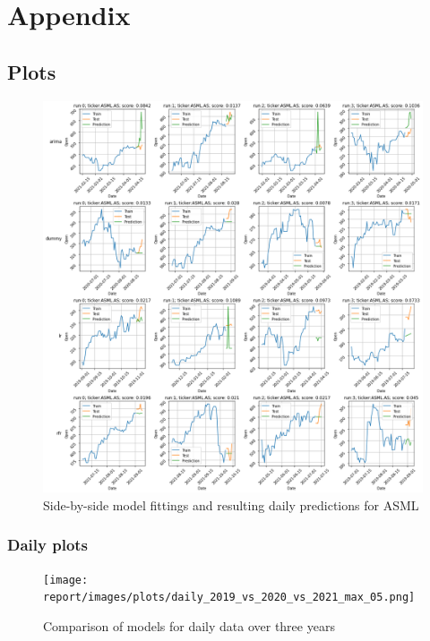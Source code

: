 \clearpage

\onecolumn

\appendix

\section{Appendix}

\subsection{Plots}

\begin{figure}[H]
  \includegraphics[width=\textwidth]{images/plots/sample_fits_asml.png}
  \caption{Side-by-side model fittings and resulting daily predictions for ASML}
  \label{fig:samplefits}
\end{figure}

\pagebreak

\subsubsection{Daily plots}

\twocolumn

\begin{figure}[H]
    \texttt{[image: report/images/plots/daily\_2019\_vs\_2020\_vs\_2021\_max\_05.png]}
    \caption{Comparison of models for daily data over three years}
\end{figure}

